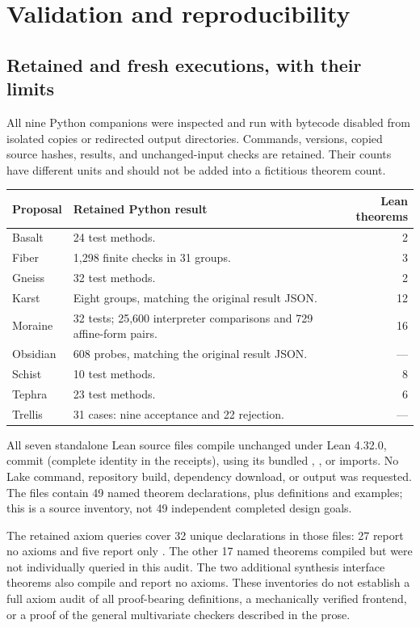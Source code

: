 \documentclass[11pt,letterpaper]{article}
\newcommand{\code}[1]{\texttt{\detokenize{#1}}}
\theoremstyle{definition}\newtheorem{definition}[proposition]{Definition}
\theoremstyle{remark}\newtheorem{remark}[proposition]{Remark}
\begin{document}
\section{Validation and reproducibility}\label{app:validation}
\begingroup\small\setlength{\parskip}{0.35em}

\subsection{Retained and fresh executions, with their limits}
All nine Python companions were inspected and run with bytecode disabled from
isolated copies or redirected output directories. Commands, versions, copied
source hashes, results, and unchanged-input checks are retained. Their counts
have different units and should not be added into a fictitious theorem count.
\begin{center}\small
\begin{tabularx}{\textwidth}{@{}l Y r@{}}
\toprule Proposal & Retained Python result & Lean theorems\\\midrule
Basalt & 24 test methods. & 2\\
Fiber & 1,298 finite checks in 31 groups. & 3\\
Gneiss & 32 test methods. & 2\\
Karst & Eight groups, matching the original result JSON. & 12\\
Moraine & 32 tests; 25,600 interpreter comparisons and 729 affine-form pairs. & 16\\
Obsidian & 608 probes, matching the original result JSON. & ---\\
Schist & 10 test methods. & 8\\
Tephra & 23 test methods. & 6\\
Trellis & 31 cases: nine acceptance and 22 rejection. & ---\\
\bottomrule
\end{tabularx}
\end{center}

All seven standalone Lean source files compile unchanged under Lean 4.32.0,
commit \code{8c9756b} (complete identity in the receipts), using its bundled
\code{Init}, \code{Std}, or \code{Lean} imports. No Lake command, repository
build, dependency download, or output \code{.olean} was requested. The files
contain 49 named theorem declarations, plus definitions and examples; this is
a source inventory, not 49 independent completed design goals.

The retained axiom queries cover 32 unique declarations in those files:
27 report no axioms and five report only \code{propext}. The other 17 named
theorems compiled but were not individually queried in this audit. The two
additional synthesis interface theorems also compile and report no axioms.
These inventories do not establish a full axiom audit of all proof-bearing
definitions, a mechanically verified frontend, or a proof of the general
multivariate checkers described in the prose.
\end{document}
